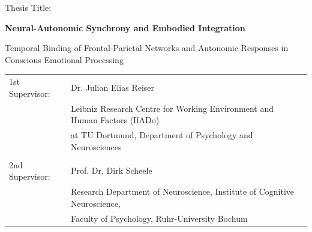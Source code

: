\documentclass[12pt]{article} %
\begin{document}
\begin{titlepage}
\begin{center}
        \vspace{0.5cm}
        Thesis Title:

        \vspace{0.2cm}
        \textbf{Neural-Autonomic Synchrony and Embodied Integration}

        \vspace{0.2cm}
        Temporal Binding of Frontal-Parietal Networks and Autonomic Responses in Conscious Emotional Processing

        \vspace{0.5cm}
        \begin{minipage}{0.8\textwidth}
            \begin{tabular}{p{} p{}}
                1st Supervisor: & Dr. Julian Elias Reiser \\
                & Leibniz Research Centre for Working Environment and Human Factors (IfADo) \\
                & at TU Dortmund, Department of Psychology and Neurosciences\\
                \\
                2nd Supervisor: & Prof. Dr. Dirk Scheele \\
                & Research Department of Neuroscience, Institute of Cognitive Neuroscience, \\
                & Faculty of Psychology, Ruhr-University Bochum \\
            \end{tabular}
        \end{minipage}

        \vspace{\fill} %
    \end{center}
\end{titlepage}

\newpage

\tableofcontents %

\newpage

\listoffigures %

\newpage

\printglossary[style=long3col, %
               type=\acronymtype, %
               title=List of Acronyms] %
\end{document}
